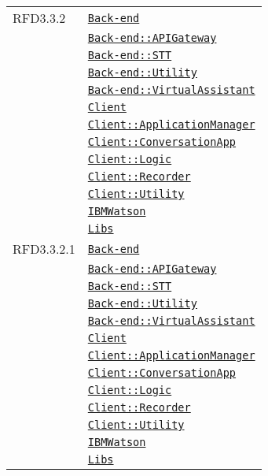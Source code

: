 \begin{longtable}{|>{\centering}m{3cm}|m{10cm}<{\centering}|}
RFD3.3.2 & \hyperref[Back-end]{\texttt{Back-end}}\\
& \hyperref[Back-end::APIGateway]{\texttt{Back-end::APIGateway}}\\
& \hyperref[Back-end::STT]{\texttt{Back-end::STT}}\\
& \hyperref[Back-end::Utility]{\texttt{Back-end::Utility}}\\
& \hyperref[Back-end::VirtualAssistant]{\texttt{Back-end::VirtualAssistant}}\\
& \hyperref[Client]{\texttt{Client}}\\
& \hyperref[Client::ApplicationManager]{\texttt{Client::ApplicationManager}}\\
& \hyperref[Client::ConversationApp]{\texttt{Client::ConversationApp}}\\
& \hyperref[Client::Logic]{\texttt{Client::Logic}}\\
& \hyperref[Client::Recorder]{\texttt{Client::Recorder}}\\
& \hyperref[Client::Utility]{\texttt{Client::Utility}}\\
& \hyperref[IBMWatson]{\texttt{IBMWatson}}\\
& \hyperref[Libs]{\texttt{Libs}}\\ \hline

RFD3.3.2.1 & \hyperref[Back-end]{\texttt{Back-end}}\\
& \hyperref[Back-end::APIGateway]{\texttt{Back-end::APIGateway}}\\
& \hyperref[Back-end::STT]{\texttt{Back-end::STT}}\\
& \hyperref[Back-end::Utility]{\texttt{Back-end::Utility}}\\
& \hyperref[Back-end::VirtualAssistant]{\texttt{Back-end::VirtualAssistant}}\\
& \hyperref[Client]{\texttt{Client}}\\
& \hyperref[Client::ApplicationManager]{\texttt{Client::ApplicationManager}}\\
& \hyperref[Client::ConversationApp]{\texttt{Client::ConversationApp}}\\
& \hyperref[Client::Logic]{\texttt{Client::Logic}}\\
& \hyperref[Client::Recorder]{\texttt{Client::Recorder}}\\
& \hyperref[Client::Utility]{\texttt{Client::Utility}}\\
& \hyperref[IBMWatson]{\texttt{IBMWatson}}\\
& \hyperref[Libs]{\texttt{Libs}}\\ \hline


\end{longtable}
